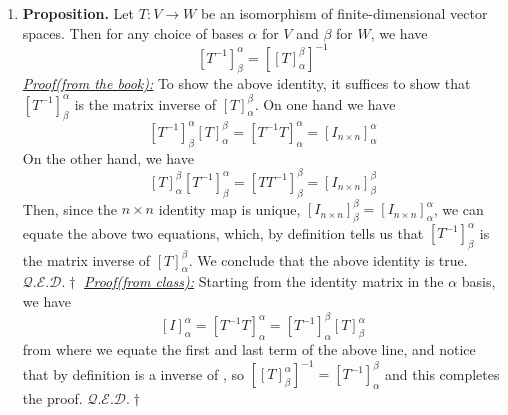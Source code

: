 \documentclass[oneside, 12pt]{book}
\newcommand{\settag}[1]{\renewcommand{\theenumi}{#1}}
\newcommand{\qed}{\hfill $\mathcal{Q}.\mathcal{E}.\mathcal{D}.\dagger$}
\newcommand{\tbf}[1]{\textbf{#1}}
\newcommand{\tit}[1]{\textit{#1}}
\newcommand{\trans}[3]{$#1:#2\rightarrow{}#3$}
\newcommand{\map}[3]{\text{$\left[#1\right]_{#2}^{#3}$}}
\newcommand{\para}[1]{\item \tbf{#1}}
\begin{document}
\begin{enumerate}
    \settag{2.6.11}
    \para{Proposition.} Let \trans{T}{V}{W} be an isomorphism of finite-dimensional vector spaces. Then for any choice of bases $\alpha$ for $V$ and $\beta$ for $W$, we have
    \begin{equation*}
        \left[T^{-1}\right]_\beta^\alpha = \left[\left[T\right]^\beta_\alpha\right]^{-1}
    \end{equation*}
    \tit{\underline{Proof(from the book):}} \newline
    To show the above identity, it suffices to show that $\left[T^{-1}\right]_\beta^\alpha$ is the matrix inverse of $\left[T\right]_\alpha^\beta$. On one hand we have
    \begin{equation*}
        \left[T^{-1}\right]_\beta^\alpha \left[T\right]^\beta_\alpha = \left[T^{-1}T\right]_\alpha^\alpha = \left[I_{n \times n}\right]_\alpha^\alpha
    \end{equation*}
    On the other hand, we have
    \begin{equation*}
        \left[T\right]^\beta_\alpha \left[T^{-1}\right]_\beta^\alpha = \left[TT^{-1}\right]_\beta^\beta = \left[I_{n \times n}\right]_\beta^\beta
    \end{equation*}
    Then, since the $n\times n$ identity map is unique, $\left[I_{n \times n}\right]_\beta^\beta = \left[I_{n \times n}\right]_\alpha^\alpha$, we can equate the above two equations, which, by definition tells us that $\left[T^{-1}\right]_\beta^\alpha$ is the matrix inverse of $\left[T\right]_\alpha^\beta$. We conclude that the above identity is true.\qed \newline
    \tit{\underline{Proof(from class):}} \newline
    Starting from the identity matrix in the $\alpha$ basis, we have
    \begin{equation}
        \map{I}{\alpha}{\alpha} = \map{T^{-1}T}{\alpha}{\alpha} = \map{T^{-1}}{\alpha}{\beta} \map{T}{\beta}{\alpha} 
    \end{equation}
    from where we equate the first and last term of the above line, and notice that by definition \map{T}{\beta}{\alpha} is a inverse of \map{T^{-1}}{\alpha}{\beta}, so $\left[\map{T}{\beta}{\alpha} \right]^{-1} = \map{T^{-1}}{\alpha}{\beta}$ and this completes the proof. \qed
\end{enumerate}
\end{document}
